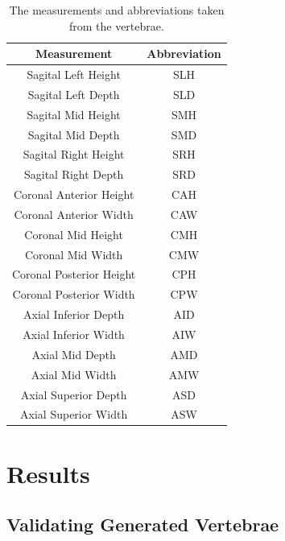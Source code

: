 \begin{table}[ht!]
	\caption{The measurements and abbreviations taken from the vertebrae.}
	\label{tab:measurements}
	\centering
	\begin{tabular}{c|c}
    Measurement & Abbreviation \\
    \hline
    \hline
    Sagital Left Height & SLH \\
	Sagital Left Depth & SLD \\
    Sagital Mid Height & SMH \\
	Sagital Mid Depth & SMD \\
    Sagital Right Height & SRH \\
	Sagital Right Depth & SRD \\
	Coronal Anterior Height & CAH \\
	Coronal Anterior Width & CAW \\
	Coronal Mid Height & CMH \\
	Coronal Mid Width & CMW \\
	Coronal Posterior Height & CPH \\
	Coronal Posterior Width & CPW \\
	Axial Inferior Depth & AID \\
	Axial Inferior Width & AIW \\
	Axial Mid Depth & AMD \\
	Axial Mid Width & AMW \\
	Axial Superior Depth & ASD \\
	Axial Superior Width & ASW \\
	\hline
	\end{tabular}
\end{table}


\section{Results}

\subsection{Validating Generated Vertebrae} \label{sec:pca_val}

